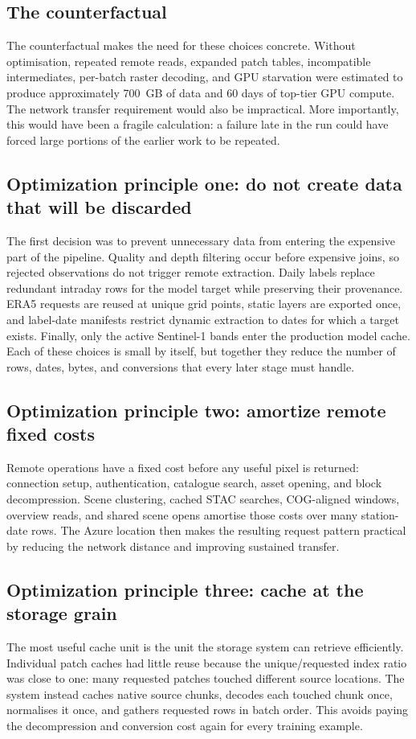 \documentclass[12pt,a4paper]{report}
\begin{document}
\subsection{The counterfactual}
The counterfactual makes the need for these choices concrete. Without
optimisation, repeated remote reads, expanded patch tables, incompatible
intermediates, per-batch raster decoding, and GPU starvation were estimated to
produce approximately 700~GB of data and 60 days of top-tier GPU compute. The
network transfer requirement would also be impractical. More importantly, this
would have been a fragile calculation: a failure late in the run could have
forced large portions of the earlier work to be repeated.

\subsection{Optimization principle one: do not create data that will be discarded}
The first decision was to prevent unnecessary data from entering the expensive
part of the pipeline. Quality and depth filtering occur before expensive joins,
so rejected observations do not trigger remote extraction. Daily labels replace
redundant intraday rows for the model target while preserving their provenance.
ERA5 requests are reused at unique grid points, static layers are exported
once, and label-date manifests restrict dynamic extraction to dates for which a
target exists. Finally, only the active Sentinel-1 bands enter the production
model cache. Each of these choices is small by itself, but together they reduce
the number of rows, dates, bytes, and conversions that every later stage must
handle.

\subsection{Optimization principle two: amortize remote fixed costs}
Remote operations have a fixed cost before any useful pixel is returned:
connection setup, authentication, catalogue search, asset opening, and block
decompression. Scene clustering, cached STAC searches, COG-aligned windows,
overview reads, and shared scene opens amortise those costs over many
station-date rows. The Azure location then makes the resulting request pattern
practical by reducing the network distance and improving sustained transfer.

\subsection{Optimization principle three: cache at the storage grain}
The most useful cache unit is the unit the storage system can retrieve
efficiently. Individual patch caches had little reuse because the
unique/requested index ratio was close to one: many requested patches touched
different source locations. The system instead caches native source chunks,
decodes each touched chunk once, normalises it once, and gathers requested rows
in batch order. This avoids paying the decompression and conversion cost again
for every training example.
\end{document}

